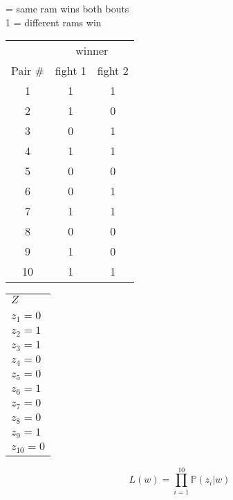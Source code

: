 \documentclass[landscape]{foils}
\renewcommand{\Pr}{\mathbb{P}}
\begin{document}
 = same ram wins both bouts\\
1 = different rams win\\
\begin{center}
\begin{tabular}{|c|c|c|}
\hline
& \multicolumn{2}{c|}{winner}\\
Pair \# & fight 1 & fight 2 \\
\hline
1 & 1 & 1  \\
\hline
2 & 1 & 0  \\
\hline
3 & 0 & 1  \\
\hline
4 & 1 & 1  \\
\hline
5 & 0 & 0  \\
\hline
6 & 0 & 1   \\
\hline
7 & 1 & 1  \\
\hline
8 & 0 & 0  \\
\hline
9 & 1 & 0  \\
\hline
10 & 1 & 1   \\
\hline
\end{tabular}
\begin{tabular}{l}
$Z$\\
\\
$z_1 = 0$   \\
$z_2 = 1$  \\
$z_3 = 1$  \\
$z_4 = 0$  \\
$z_5 = 0$  \\
$z_6 = 1$  \\
$z_7 = 0$  \\
$z_8 = 0$  \\
$z_9 = 1$  \\
$z_{10} = 0$  \\
\end{tabular}
\end{center}


$$L(w) = \prod_{i=1}^{10} \Pr(z_i|w)$$
\end{document}
